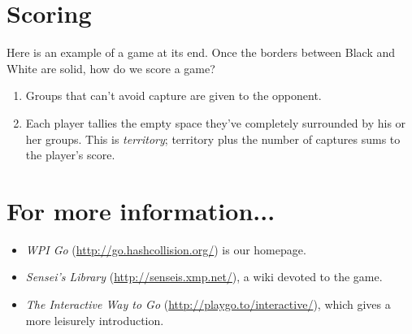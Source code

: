 \documentclass{article}
\begin{document}
\section*{Scoring}

Here is an example of a game at its end.
Once the borders between Black and White are solid, how do we score a game?
\begin{enumerate}
\item Groups that can't avoid capture are given to the opponent.

\item Each player tallies the empty space they've completely surrounded
  by his or her groups.  This is \emph{territory}; territory plus the
  number of captures sums to the player's score.
\end{enumerate}




\section*{For more information...}
\begin{itemize}
\item \emph{WPI Go} (\url{http://go.hashcollision.org/}) is our homepage.

\item \emph{Sensei's Library} (\url{http://senseis.xmp.net/}), a wiki
  devoted to the game.

\item \emph{The Interactive Way to Go}
  (\url{http://playgo.to/interactive/}), which gives a more leisurely
  introduction.
\end{itemize}
\end{document}
